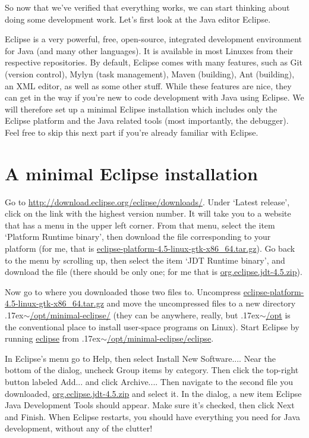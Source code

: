 \documentclass[12pt, a4paper, twoside, openany, titlepage]{book}
\newcommand{\mytilde}{\raise.17ex\hbox{$\scriptstyle\sim$}}
\begin{document}
So now that we've verified that everything works, we can start thinking about doing some development work. Let's first look at the Java editor Eclipse.

Eclipse is a very powerful, free, open-source, integrated development environment for Java (and many other languages). It is available in most Linuxes from their respective repositories. By default, Eclipse comes with many features, such as Git (version control), Mylyn (task management), Maven (building), Ant (building), an XML editor, as well as some other stuff. While these features are nice, they can get in the way if you're new to code development with Java using Eclipse. We will therefore set up a minimal Eclipse installation which includes only the Eclipse platform and the Java related tools (most importantly, the debugger). Feel free to skip this next part if you're already familiar with Eclipse.

\section{A minimal Eclipse installation}

Go to \url{http://download.eclipse.org/eclipse/downloads/}. Under `Latest release', click on the link with the highest version number. It will take you to a website that has a menu in the upper left corner. From that menu, select the item `Platform Runtime binary', then download the file corresponding to your platform (for me, that is \url{eclipse-platform-4.5-linux-gtk-x86_64.tar.gz}). Go back to the menu by scrolling up, then select the item `JDT Runtime binary', and download the file (there should be only one; for me that is \url{org.eclipse.jdt-4.5.zip}).

Now go to where you downloaded those two files to. Uncompress \url{eclipse-platform-4.5-linux-gtk-x86_64.tar.gz} and move the uncompressed files to a new directory \mytilde\url{/opt/minimal-eclipse/} (they can be anywhere, really, but \mytilde\url{/opt} is the conventional place to install user-space programs on Linux). Start Eclipse by running \url{eclipse} from \mytilde\url{/opt/minimal-eclipse/eclipse}.

In Eclipse's menu go to \textsf{Help}, then select \textsf{Install New Software...}. Near the bottom of the dialog, uncheck \textsf{Group items by category}. Then click the top-right button labeled \textsf{Add...} and click \textsf{Archive...}. Then navigate to the second file you downloaded, \url{org.eclipse.jdt-4.5.zip} and select it. In the dialog, a new item \textsf{Eclipse Java Development Tools} should appear. Make sure it's checked, then click \textsf{Next} and \textsf{Finish}. When Eclipse restarts, you should have everything you need for Java development, without any of the clutter!
\end{document}
